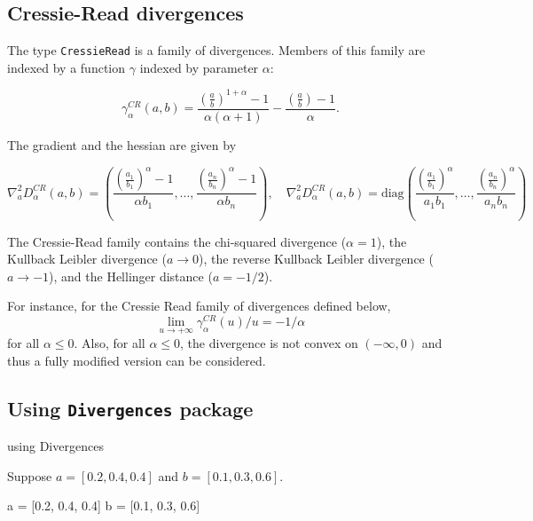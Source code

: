 \documentclass[
  letterpaper,
  DIV=11,
  numbers=noendperiod]{scrartcl}
\newenvironment{Shaded}{\begin{snugshade}}{\end{snugshade}}
\newcommand{\BuiltInTok}[1]{\textcolor[rgb]{0.00,0.23,0.31}{#1}}
\newcommand{\FloatTok}[1]{\textcolor[rgb]{0.68,0.00,0.00}{#1}}
\newcommand{\ImportTok}[1]{\textcolor[rgb]{0.00,0.46,0.62}{#1}}
\newcommand{\NormalTok}[1]{\textcolor[rgb]{0.00,0.23,0.31}{#1}}
\newcommand{\OperatorTok}[1]{\textcolor[rgb]{0.37,0.37,0.37}{#1}}
\begin{document}
\subsection{Cressie-Read divergences}\label{cressie-read-divergences}

The type \texttt{CressieRead} is a family of divergences. Members of
this family are indexed by a function \(\gamma\) indexed by parameter
\(\alpha\):

\[
\gamma_{\alpha}^{CR}(a,b)=\frac{\left(\frac{a}{b}\right)^{1+\alpha}-1}{\alpha(\alpha+1)}-\frac{\left(\frac{a}{b}\right)-1}{\alpha}.
\]

The gradient and the hessian are given by

\[
\nabla_{a}^{2}D^{CR}_{\alpha}(a,b) = \left(
\frac{\left(\frac{a_1}{b_1}\right)^{\alpha }-1}{\alpha  b_1}, \ldots,\frac{\left(\frac{a_n}{b_n}\right)^{\alpha }-1}{\alpha  b_n}
\right), \quad 
\nabla_{a}^{2}D^{CR}_{\alpha}(a,b) = \mathrm{diag}\left(\frac{\left(\frac{a_1}{b_1}\right)^{\alpha }}{a_1 b_1},\ldots,
\frac{\left(\frac{a_n}{b_n}\right)^{\alpha }}{a_n b_n}
\right)
\]

The Cressie-Read family contains the chi-squared divergence (\(\alpha =
1\)), the Kullback Leibler divergence (\(a \to 0\)), the reverse
Kullback Leibler divergence (\(a \to -1\)), and the Hellinger distance
(\(a = -1/2\)).

For instance, for the Cressie Read family of divergences defined below,
\[
\lim_{u\to +\infty}\gamma^{CR}_{\alpha}(u)/u = -1/\alpha
\] for all \(\alpha\leqslant 0\). Also, for all \(\alpha\leqslant 0\),
the divergence is not convex on \((-\infty, 0)\) and thus a fully
modified version can be considered.

\subsection{\texorpdfstring{Using \texttt{Divergences}
package}{Using Divergences package}}\label{using-divergences-package}

\begin{Shaded}
\begin{Highlighting}[]
\ImportTok{using} \BuiltInTok{Divergences}
\end{Highlighting}
\end{Shaded}

Suppose \(a = [0.2, 0.4, 0.4]\) and \(b = [0.1, 0.3, 0.6]\).

\begin{Shaded}
\begin{Highlighting}[]
\NormalTok{a }\OperatorTok{=}\NormalTok{ [}\FloatTok{0.2}\NormalTok{, }\FloatTok{0.4}\NormalTok{, }\FloatTok{0.4}\NormalTok{]}
\NormalTok{b }\OperatorTok{=}\NormalTok{ [}\FloatTok{0.1}\NormalTok{, }\FloatTok{0.3}\NormalTok{, }\FloatTok{0.6}\NormalTok{]}
\end{Highlighting}
\end{Shaded}
\end{document}

